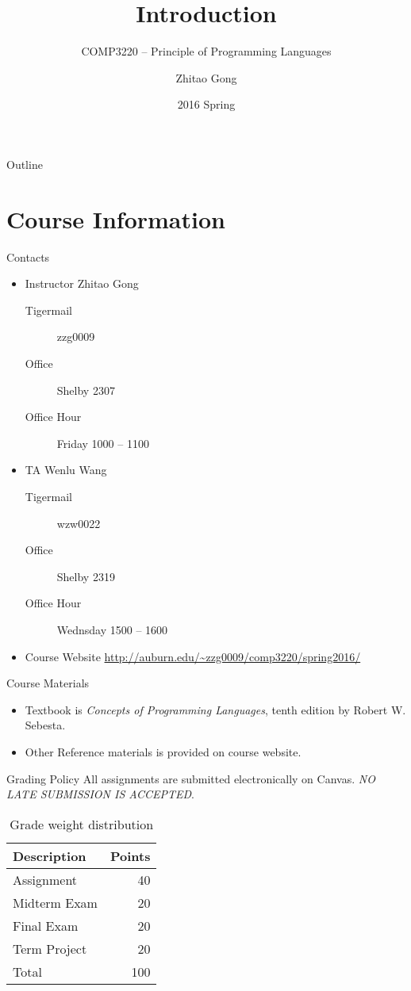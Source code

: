 \documentclass[presentation]{beamer}
\author{Zhitao Gong}
\date{2016 Spring}
\title{Introduction}
\subtitle{COMP3220 -- Principle of Programming Languages}
\begin{document}
\maketitle
\begin{frame}{Outline}
\setcounter{tocdepth}{2}
\tableofcontents
\end{frame}


\section{Course Information}
\label{sec:orgheadline6}

\begin{frame}[label={sec:orgheadline1}]{Contacts}
\begin{itemize}
\item Instructor Zhitao Gong
\begin{description}
\item[{Tigermail}] zzg0009
\item[{Office}] Shelby 2307
\item[{Office Hour}] Friday 1000 -- 1100
\end{description}
\item TA Wenlu Wang
\begin{description}
\item[{Tigermail}] wzw0022
\item[{Office}] Shelby 2319
\item[{Office Hour}] Wednsday 1500 -- 1600
\end{description}
\item Course Website \url{http://auburn.edu/~zzg0009/comp3220/spring2016/}
\end{itemize}
\end{frame}

\begin{frame}[label={sec:orgheadline2}]{Course Materials}
\begin{itemize}
\item Textbook is \emph{Concepts of Programming Languages}, tenth edition by
Robert W. Sebesta.
\item Other Reference materials is provided on course website.
\end{itemize}
\end{frame}

\begin{frame}[label={sec:orgheadline3}]{Grading Policy}
All assignments are submitted electronically on Canvas.  \emph{NO LATE
SUBMISSION IS ACCEPTED}.

\begin{table}[htb]
\caption{\label{tab:grade-weight}
Grade weight distribution}
\centering
\begin{tabular}{lr}
Description & Points\\
\hline
Assignment & 40\\
Midterm Exam & 20\\
Final Exam & 20\\
Term Project & 20\\
\hline
Total & 100\\
\end{tabular}
\end{table}
\end{frame}
\end{document}
